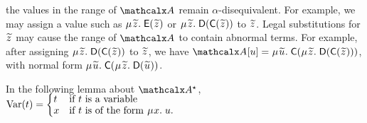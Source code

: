 \begin{examplex}
the values in the range of $\Val$ remain $\alpha$-disequivalent.
For example, we may assign a value such as
$\MU {\Varec{z}}.\; \const{E}( {\Varec{z}} )$ or
$\MU {\Varec{z}}.\; \const{D}( \const{C}( {\Varec{z}} ) )$
to ${\Varec{z}}$.
Legal substitutions for ${\Varec{z}}$ may cause the range of $\Val$ to contain abnormal terms.
For example, after assigning $\MU {\Varec{z}}.\; \const{D}( \const{C}( {\Varec{z}} ) )$ to $\Varec{z}$, we have
$\Val \ec{u} = \MU {\Varec{u}}.\; \const{C}( \MU {\Varec{z}}.\; \const{D}( \const{C}( {\Varec{z}} ) ) )$,
with normal form
$\MU {\Varec{u}}.\; \const{C}( \MU {\Varec{z}}.\; \const{D}( {\Varec{u}} ) )$.
\xend
\end{examplex}

In the following lemma about $\ValC$,
$\vphantom{\Bigl(_j}\muvar( t ) = \smash{\begin{cases}
  t & \text{if $t$ is a variable} \\[-\jot]
  x & \text{if $t$ is of the form $\MU {x}.\; u$.} 
\end{cases}}$

%

